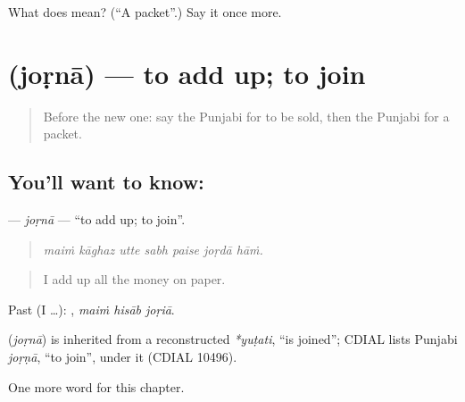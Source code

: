 \begin{tcolorbox}[breakable,colback=teal!4,colframe=teal!35!black,title={Before you move on}]
What does  mean? (\textquotedblleft{}A packet\textquotedblright{}.) Say it once more.
\end{tcolorbox}
\section[\texorpdfstring{\pa{ਜੋੜਨਾ} (joṛnā)}{ਜੋੜਨਾ (joṛnā)}]{ (joṛnā) — to add up; to join}

\label{lesson:PA-C278-jorna}



\begin{quote}
Before the new one: say the Punjabi for to be sold, then the Punjabi for a packet.
\end{quote}

\subsection*{You'll want to know: }
\textbf{} — \emph{joṛnā} — \textquotedblleft{}to add up; to join\textquotedblright{}.

\begin{quote}
      
\end{quote}

\begin{quote}
\emph{maiṁ kāghaz utte sabh paise joṛdā hāṁ.}
\end{quote}

\begin{quote}
I add up all the money on paper.
\end{quote}

Past (I …):   , \emph{maiṁ hisāb joṛiā}.

\begin{cousinweb}
\textbf{} (\emph{joṛnā}) is inherited from a reconstructed \emph{*yuṭati}, \textquotedblleft{}is joined\textquotedblright{}; CDIAL lists Punjabi \emph{joṛṇā}, \textquotedblleft{}to join\textquotedblright{}, under it (CDIAL 10496).
\end{cousinweb}

\begin{grammarlens}[title={What you've built}]
One more word for this chapter.
\end{grammarlens}

